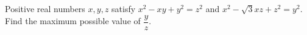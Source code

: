 Positive real numbers $x,y,z$ satisfy $x^2-xy+y^2=z^2$ and $x^2-\sqrt3xz+z^2=y^2$. Find the maximum possible value of $\dfrac{y}{z}$.
